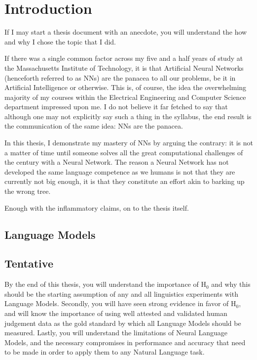 \chapter*{Introduction}

If I may start a thesis document with an anecdote, you will understand the how and why I chose the topic that I did.

If there was a single common factor across my five and a half years of study at the Massachusetts Institute of Technology, it is that Artificial Neural Networks (henceforth referred to as NNs) are the panacea to all our problems, be it in Artificial Intelligence or otherwise.  This is, of course, the idea the overwhelming majority of my courses within the Electrical Engineering and Computer Science department impressed upon me.  I do not believe it far fetched to say that although one may not explicitly say such a thing in the syllabus, the end result is the communication of the same idea: NNs are the panacea.

In this thesis, I demonstrate my mastery of NNs by arguing the contrary: it is not a matter of time until someone solves all the great computational challenges of the century with a Neural Network.  The reason a Neural Network has not developed the same language competence as we humans is not that they are currently not big enough, it is that they constitute an effort akin to barking up the wrong tree.

Enough with the inflammatory claims, on to the thesis itself.

\section{Language Models}
 

\section{Tentative}
By the end of this thesis, you will understand the importance of $\mathrm{H}_0$ and why this should be the starting assumption of any and all linguistics experiments with Language Models.  Secondly, you will have seen strong evidence in favor of $\mathrm{H}_0$, and will know the importance of using well attested and validated human judgement data as the gold standard by which all Language Models should be measured.  Lastly, you will understand the limitations of Neural Language Models, and the necessary compromises in performance and accuracy that need to be made in order to apply them to any Natural Language task.

